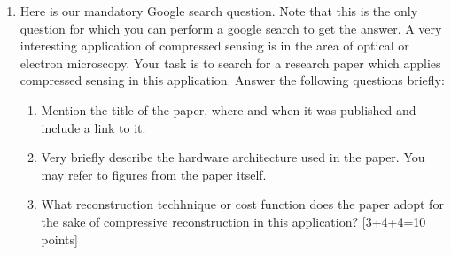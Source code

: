 \documentclass[11pt]{article}
\begin{document}
\begin{enumerate}
\item Here is our mandatory Google search question. Note that this is the only question for which you can perform a google search to get the answer. A very interesting application of compressed sensing is in the area of optical or electron microscopy. Your task is to search for a research paper which applies compressed sensing in this application. Answer the following questions briefly:
\begin{enumerate}
\item Mention the title of the paper, where and when it was published and include a link to it. 
\item Very briefly describe the hardware architecture used in the paper. You may refer to figures from the paper itself. 
\item What reconstruction techhnique or cost function does the paper adopt for the sake of compressive reconstruction in this application?  \textsf{[3+4+4=10 points]}
\end{enumerate} 



\end{enumerate}
\end{document}
